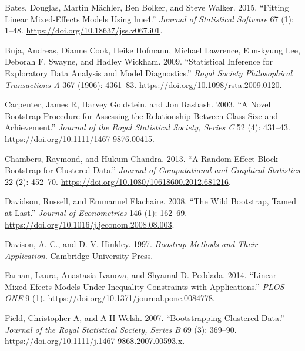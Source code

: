 \hypertarget{refs}{}
\begin{CSLReferences}{1}{0}
\leavevmode{}%
Bates, Douglas, Martin Mächler, Ben Bolker, and Steve Walker. 2015. {``Fitting Linear Mixed-Effects Models Using {lme4}.''} \emph{Journal of Statistical Software} 67 (1): 1--48. \url{https://doi.org/10.18637/jss.v067.i01}.

\leavevmode{}%
Buja, Andreas, Dianne Cook, Heike Hofmann, Michael Lawrence, Eun-kyung Lee, Deborah F. Swayne, and Hadley Wickham. 2009. {``Statistical Inference for Exploratory Data Analysis and Model Diagnostics.''} \emph{Royal Society Philosophical Transactions A} 367 (1906): 4361--83. \url{https://doi.org/10.1098/rsta.2009.0120}.

\leavevmode{}%
Carpenter, James R, Harvey Goldstein, and Jon Rasbash. 2003. {``A Novel Bootstrap Procedure for Assessing the Relationship Between Class Size and Achievement.''} \emph{Journal of the Royal Statistical Society, Series C} 52 (4): 431--43. \url{https://doi.org/10.1111/1467-9876.00415}.

\leavevmode{}%
Chambers, Raymond, and Hukum Chandra. 2013. {``A Random Effect Block Bootstrap for Clustered Data.''} \emph{Journal of Computational and Graphical Statistics} 22 (2): 452--70. \url{https://doi.org/10.1080/10618600.2012.681216}.

\leavevmode{}%
Davidson, Russell, and Emmanuel Flachaire. 2008. {``The Wild Bootstrap, Tamed at Last.''} \emph{Journal of Econometrics} 146 (1): 162--69. \url{https://doi.org/10.1016/j.jeconom.2008.08.003}.

\leavevmode{}%
Davison, A. C., and D. V. Hinkley. 1997. \emph{Boostrap Methods and Their Application}. Cambridge University Press.

\leavevmode{}%
Farnan, Laura, Anastasia Ivanova, and Shyamal D. Peddada. 2014. {``Linear Mixed Efects Models Under Inequality Constraints with Applications.''} \emph{PLOS ONE} 9 (1). \url{https://doi.org/10.1371/journal.pone.0084778}.

\leavevmode{}%
Field, Christopher A, and A H Welsh. 2007. {``Bootstrapping Clustered Data.''} \emph{Journal of the Royal Statistical Society, Series B} 69 (3): 369--90. \url{https://doi.org/10.1111/j.1467-9868.2007.00593.x}.


\end{CSLReferences}
